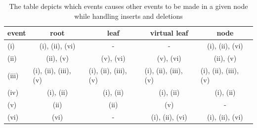 \documentclass[twoside,11pt,openright]{report}
\begin{document}
\begin{table}[]
\centering
\caption{The table depicts which events causes other events to be made in a given node while handling inserts and deletions}
\label{table:dependency_matrix}
\begin{tabular}{lcccc}
\hline
event & root & leaf & virtual leaf & node \\ \hline
(i) & {\color[HTML]{333333} (i), (ii), (vi)} & - & - & (i), (ii), (vi) \\
(ii)  & (ii), (v) & (v), (vi) & (v), (vi) & (ii), (v) \\
(iii)  & \multicolumn{1}{l}{(i), (ii), (iii), (v)} & \multicolumn{1}{l}{(i), (ii), (iii), (v)} & \multicolumn{1}{l}{(i), (ii), (iii), (v)} & \multicolumn{1}{l}{(i), (ii), (iii), (v)} \\
(iv) & (i), (ii) & (i), (ii) & (i), (ii) & (i), (ii) \\
(v)  & (ii) & (ii) & (v) & - \\
(vi)  & (vi) & - & (i), (ii), (vi) & (i), (ii), (vi)
\end{tabular}
\end{table}
\end{document}
